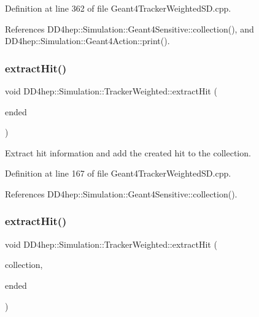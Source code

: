 Definition at line 362 of file Geant4\+Tracker\+Weighted\+S\+D.\+cpp.



References D\+D4hep\+::\+Simulation\+::\+Geant4\+Sensitive\+::collection(), and D\+D4hep\+::\+Simulation\+::\+Geant4\+Action\+::print().

\hypertarget{struct_d_d4hep_1_1_simulation_1_1_tracker_weighted_a8299b772daa5da7c49399a40c1de172d}{}\label{struct_d_d4hep_1_1_simulation_1_1_tracker_weighted_a8299b772daa5da7c49399a40c1de172d} 
\subsubsection{\texorpdfstring{extract\+Hit()}{extractHit()}\hspace{0.1cm}{\footnotesize\ttfamily [1/2]}}
{\footnotesize\ttfamily void D\+D4hep\+::\+Simulation\+::\+Tracker\+Weighted\+::extract\+Hit (\begin{DoxyParamCaption}\item[{E\+Inside}]{ended }\end{DoxyParamCaption})\hspace{0.3cm}{\ttfamily [inline]}}



Extract hit information and add the created hit to the collection. 



Definition at line 167 of file Geant4\+Tracker\+Weighted\+S\+D.\+cpp.



References D\+D4hep\+::\+Simulation\+::\+Geant4\+Sensitive\+::collection().

\hypertarget{struct_d_d4hep_1_1_simulation_1_1_tracker_weighted_a690b6f7fdcda6bbec2e7cb89f4fce9af}{}\label{struct_d_d4hep_1_1_simulation_1_1_tracker_weighted_a690b6f7fdcda6bbec2e7cb89f4fce9af} 
\subsubsection{\texorpdfstring{extract\+Hit()}{extractHit()}\hspace{0.1cm}{\footnotesize\ttfamily [2/2]}}
{\footnotesize\ttfamily void D\+D4hep\+::\+Simulation\+::\+Tracker\+Weighted\+::extract\+Hit (\begin{DoxyParamCaption}\item[{\hyperlink{class_d_d4hep_1_1_simulation_1_1_geant4_hit_collection}{Geant4\+Hit\+Collection} $\ast$}]{collection,  }\item[{E\+Inside}]{ended }\end{DoxyParamCaption})\hspace{0.3cm}{\ttfamily [inline]}}



